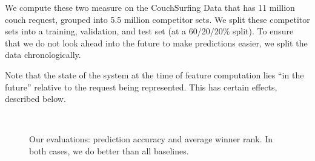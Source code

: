 We compute these two measure on the CouchSurfing Data that has 11 million couch request, grouped into 5.5 million competitor sets.
We split these competitor sets into a training, validation, and test set (at a 60/20/20\% split).
To ensure that we do not look ahead into the future to make predictions easier, we split the data chronologically.

Note that the state of the system at the time of feature computation lies ``in the future'' relative to the request being represented.
This has certain effects, described below.

\begin{figure}[ht]
\centering
{}\\
\caption{Our evaluations: prediction accuracy and average winner rank. In both cases, we do better than all baselines.}
\label{fig:eval}
\end{figure}

